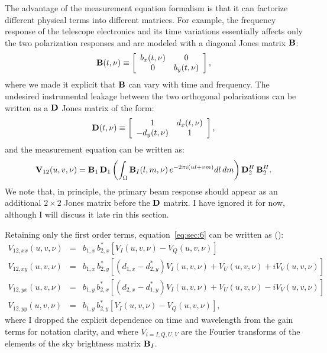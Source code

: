 The advantage of the measurement equation formalism is that it can factorize different physical terms into different matrices. For example, the frequency response of the telescope electronics and its time variations essentially affects only the two polarization responses and are modeled with a diagonal Jones matrix ${\bf B}$:
\begin{equation}
    {\bf B} (t,\nu) \equiv 
    \left[
    \begin{array}{cc}
    b_x (t,\nu) 	& 	0 	\\
    0 		& b_y (t,\nu) 	\\
    \end{array}
    \right],   
\label{eq:sec:4}
\end{equation} 
where we made it explicit that ${\bf B}$ can vary with time and frequency. The undesired instrumental leakage between the two orthogonal polarizations can be written as a ${\bf D}$ Jones matrix of the form:
\begin{equation}
    {\bf D} (t,\nu) \equiv 
    \left[
    \begin{array}{cc}
    1	 		& d_x (t,\nu)	\\
    -d_y (t,\nu)	& 1 	\\
    \end{array}
    \right],   
\label{eq:sec:5}
\end{equation} 
and the measurement equation can be written as:
\begin{equation}
{\bf V}_{12} (u,v,\nu) = {\bf B}_1 \, {\bf D}_1 \left( \int_\Omega {\bf B}_I (l, m, \nu) \, e^{-2 \pi i (ul + vm)} dl \, dm  \right) {\bf D}_2^H  \, {\bf B}_2^H.
\label{eq:sec:6}
\end{equation}
We note that, in principle, the primary beam response should appear as an additional $2 \times 2$ Jones matrix before the ${\bf D}$ matrix. I have ignored it for now, although I will discuss it late rin this section.

Retaining only the first order terms, equation~\ref{eq:sec:6} can be written as (\cite{sault96}):
\begin{eqnarray}
V_{12,xx} (u,v,\nu) & = & b_{1,x} \, b_{2,x}^* [V_I (u,v,\nu) - V_Q (u,v,\nu)]\\
V_{12,xy} (u,v,\nu) & = & b_{1,x} \, b_{2,y}^* [(d_{1,x} - d_{2,y}^*) V_I (u,v,\nu) + V_U (u,v,\nu) + iV_V (u,v,\nu)]	\\
V_{12,yx} (u,v,\nu) & = & b_{1,y} \, b_{2,x}^* [(d_{2,x} - d_{1,y}^*) V_I (u,v,\nu) + V_U (u,v,\nu) - iV_V (u,v,\nu)]	\\
V_{12,yy} (u,v,\nu) & = & b_{1,y} \, b_{2,y}^* [V_I (u,v,\nu) - V_Q (u,v,\nu)],
\label{eq:sec:7}
\end{eqnarray}
where I dropped the explicit dependence on time and wavelength from the gain terms for notation clarity, and where $V_{i=I, Q, U, V}$ are the Fourier transforms of the elements of the sky brightness matrix ${\bf B}_I$.

